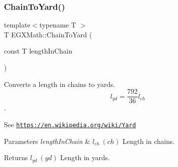 \subsubsection{\texorpdfstring{Chain\+To\+Yard()}{ChainToYard()}}
{\footnotesize\ttfamily template$<$typename T $>$ \\
T E\+G\+X\+Math\+::\+Chain\+To\+Yard (\begin{DoxyParamCaption}\item[{const T}]{length\+In\+Chain }\end{DoxyParamCaption})}



Converts a length in chains to yards. \[ l_{yd}= \frac{792}{36} l_{ch} \]. 

See \href{https://en.wikipedia.org/wiki/Yard}{\tt https\+://en.\+wikipedia.\+org/wiki/\+Yard} 
\begin{DoxyParams}{Parameters}
{\em length\+In\+Chain} & $ l_{ch}\ (ch)$ Length in chains. \\
\hline
\end{DoxyParams}
\begin{DoxyReturn}{Returns}
$ l_{yd}\ (yd)$ Length in yards. 
\end{DoxyReturn}
